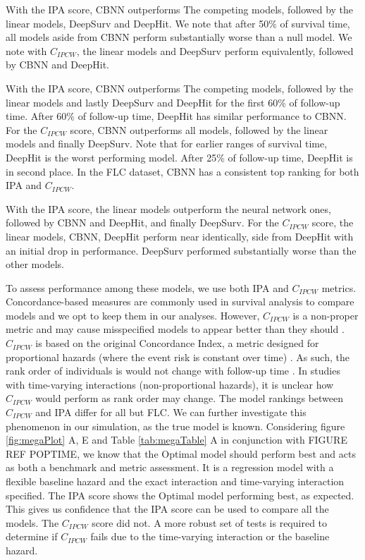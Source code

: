 With the IPA score, CBNN outperforms
The competing models, followed by the linear models, DeepSurv and DeepHit. We note that after
50\% of survival time, all models aside from CBNN perform substantially worse than a null model.
We note with \(C_{IPCW}\), the linear models and DeepSurv perform equivalently, followed by CBNN and
DeepHit.


With the IPA score, CBNN outperforms
The competing models, followed by the linear models and lastly DeepSurv and DeepHit for the first 60\% of follow-up time. 
After 60\% of follow-up time, DeepHit has similar performance to CBNN. For the \(C_{IPCW}\) score, CBNN outperforms all models,
followed by the linear models and finally DeepSurv. Note that for earlier ranges of survival time, DeepHit is the worst performing model. 
After 25\% of follow-up time, DeepHit is in second place. In the FLC dataset, CBNN has a consistent top ranking for both IPA and \(C_{IPCW}\).




 With the IPA score, the linear models
outperform the neural network ones, followed by CBNN and DeepHit, and
finally DeepSurv. For the \(C_{IPCW}\) score, the linear models, CBNN, DeepHit
perform near identically, side from DeepHit with an initial drop in performance.
DeepSurv performed substantially worse than the other models.


To assess performance among these models, we use both IPA and
\(C_{IPCW}\) metrics. Concordance-based measures are commonly used in
survival analysis to compare models and we opt to keep them in our
analyses. However, \(C_{IPCW}\) is a non-proper metric and may cause
misspecified models to appear better than they should
\citep{cindexfails2019}. \(C_{IPCW}\) is based on the original Concordance
Index, a metric designed for proportional hazards (where the event risk is
constant over time) \citep{uno2011}. As such, the rank order of individuals
is would not change with follow-up time \citep{uno2011}. In studies with time-varying interactions (non-proportional hazards),
it is unclear how \(C_{IPCW}\) would perform as rank order may change. 
The model rankings between \(C_{IPCW}\) and IPA differ for all but FLC. We can further investigate this phenomenon
in our simulation, as the true model is known. Considering figure \ref{fig:megaPlot} A, E and
Table \ref{tab:megaTable} A in conjunction with FIGURE REF POPTIME, we know that the Optimal model should perform
best and acts as both a benchmark and metric assessment. It is a regression
model with a flexible baseline hazard and the exact interaction and time-varying interaction
specified. The IPA score shows the Optimal model performing best, as expected. This gives us
confidence that the IPA score can be used to compare all the models. The \(C_{IPCW}\) score did not.
A more robust set of tests is required to determine if \(C_{IPCW}\) fails due to the time-varying interaction or
the baseline hazard.

